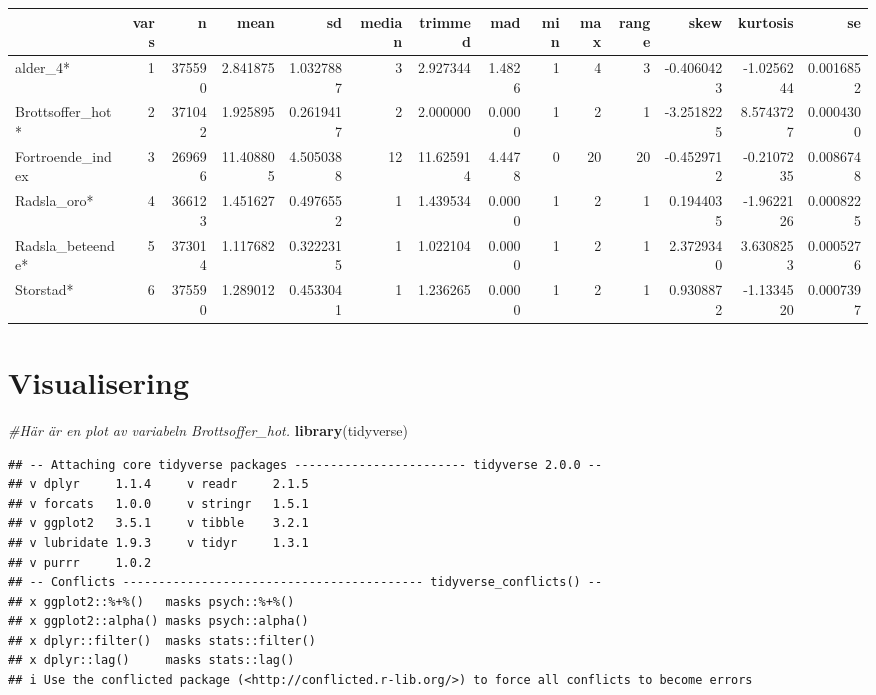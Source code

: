 \documentclass[
]{book}
\newenvironment{Shaded}{\begin{snugshade}}{\end{snugshade}}
\newcommand{\CommentTok}[1]{\textcolor[rgb]{0.56,0.35,0.01}{\textit{#1}}}
\newcommand{\FunctionTok}[1]{\textcolor[rgb]{0.13,0.29,0.53}{\textbf{#1}}}
\newcommand{\NormalTok}[1]{#1}
\begin{document}
\begin{tabular}{l|r|r|r|r|r|r|r|r|r|r|r|r|r}
\hline
  & vars & n & mean & sd & median & trimmed & mad & min & max & range & skew & kurtosis & se\\
\hline
alder\_4* & 1 & 375590 & 2.841875 & 1.0327887 & 3 & 2.927344 & 1.4826 & 1 & 4 & 3 & -0.4060423 & -1.0256244 & 0.0016852\\
\hline
Brottsoffer\_hot* & 2 & 371042 & 1.925895 & 0.2619417 & 2 & 2.000000 & 0.0000 & 1 & 2 & 1 & -3.2518225 & 8.5743727 & 0.0004300\\
\hline
Fortroende\_index & 3 & 269696 & 11.408805 & 4.5050388 & 12 & 11.625914 & 4.4478 & 0 & 20 & 20 & -0.4529712 & -0.2107235 & 0.0086748\\
\hline
Radsla\_oro* & 4 & 366123 & 1.451627 & 0.4976552 & 1 & 1.439534 & 0.0000 & 1 & 2 & 1 & 0.1944035 & -1.9622126 & 0.0008225\\
\hline
Radsla\_beteende* & 5 & 373014 & 1.117682 & 0.3222315 & 1 & 1.022104 & 0.0000 & 1 & 2 & 1 & 2.3729340 & 3.6308253 & 0.0005276\\
\hline
Storstad* & 6 & 375590 & 1.289012 & 0.4533041 & 1 & 1.236265 & 0.0000 & 1 & 2 & 1 & 0.9308872 & -1.1334520 & 0.0007397\\
\hline
\end{tabular}

\section{Visualisering}\label{visualisering}

\begin{Shaded}
\begin{Highlighting}[]
\CommentTok{\#Här är en plot av variabeln \textquotesingle{}Brottsoffer\_hot\textquotesingle{}.  }
\FunctionTok{library}\NormalTok{(tidyverse)}
\end{Highlighting}
\end{Shaded}

\begin{verbatim}
## -- Attaching core tidyverse packages ------------------------ tidyverse 2.0.0 --
## v dplyr     1.1.4     v readr     2.1.5
## v forcats   1.0.0     v stringr   1.5.1
## v ggplot2   3.5.1     v tibble    3.2.1
## v lubridate 1.9.3     v tidyr     1.3.1
## v purrr     1.0.2     
## -- Conflicts ------------------------------------------ tidyverse_conflicts() --
## x ggplot2::%+%()   masks psych::%+%()
## x ggplot2::alpha() masks psych::alpha()
## x dplyr::filter()  masks stats::filter()
## x dplyr::lag()     masks stats::lag()
## i Use the conflicted package (<http://conflicted.r-lib.org/>) to force all conflicts to become errors
\end{verbatim}
\end{document}
